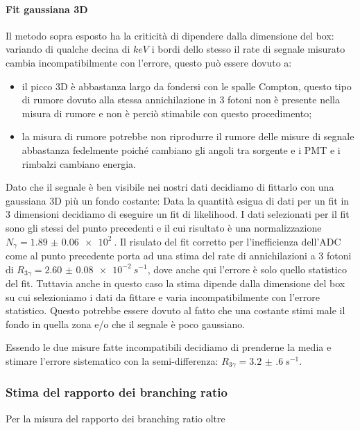 \paragraph{Fit gaussiana 3D}
Il metodo sopra esposto ha la criticità di dipendere dalla dimensione del box: variando di qualche decina di $\si{keV}$ i bordi dello stesso il rate di segnale misurato cambia incompatibilmente con l'errore, questo può essere dovuto a:
\begin{itemize}
	\item il picco 3D è abbastanza largo da fondersi con le spalle Compton, questo tipo di rumore dovuto alla stessa annichilazione in 3 fotoni non è presente nella misura di rumore e non è perciò stimabile con questo procedimento;
	\item la misura di rumore potrebbe non riprodurre il rumore delle misure di segnale abbastanza fedelmente poiché cambiano gli angoli tra sorgente e i PMT e i rimbalzi cambiano energia.
\end{itemize}
Dato che il segnale è ben visibile nei nostri dati decidiamo di fittarlo con una gaussiana 3D più un fondo costante: 
Data la quantità esigua di dati per un fit in 3 dimensioni decidiamo di eseguire un fit di likelihood. I dati selezionati per il fit sono gli stessi del punto precedenti e il cui risultato è una normalizzazione $N_{\gamma} = \SI{1.89(6)e2}{}$. Il risulato del fit corretto per l'inefficienza dell'ADC come al punto precedente porta ad una stima del rate di annichilazioni a 3 fotoni di $R_{3\gamma} = \SI{2.60(8)e-2}{s^{-1}}$, dove anche qui l'errore è solo quello statistico del fit.
Tuttavia anche in questo caso la stima dipende dalla dimensione del box su cui selezioniamo i dati da fittare e varia incompatibilmente con l'errore statistico. Questo potrebbe essere dovuto al fatto che una costante stimi male il fondo in quella zona e/o che il segnale è poco gaussiano.

Essendo le due misure fatte incompatibili decidiamo di prenderne la media e stimare l'errore sistematico con la semi-differenza: $R_{3\gamma} = \SI{3.2(6)}{s^{-1}}$.

\subsubsection{Stima del rapporto dei branching ratio}
Per la misura del rapporto dei branching ratio oltre 


